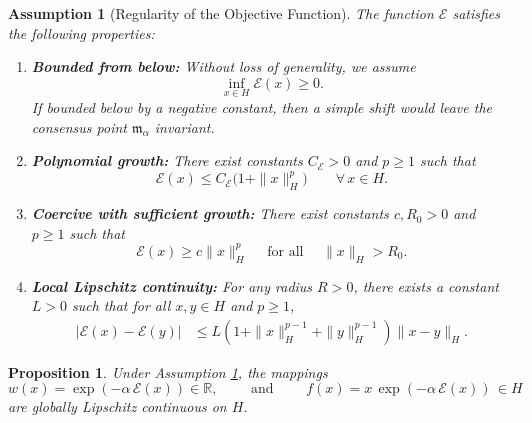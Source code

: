 \documentclass[10pt,a4paper]{amsart}
\newtheorem{assumption}{Assumption}
\newtheorem{proposition}{Proposition}
\begin{document}
\begin{assumption}[Regularity of the Objective Function]
\label{assum:objective}
The function $\mathscr{E}$ satisfies the following properties:
\begin{enumerate}
    \item \textbf{Bounded from below:} Without loss of generality, we assume 
    \begin{equation*}
        \inf_{x \in H} \mathscr{E}(x) \geq 0 .
    \end{equation*}
    If bounded below by a negative constant, then a simple shift would leave the consensus point $\mathfrak{m}_\alpha$ invariant. 
    \item \textbf{Polynomial growth:} There exist constants $C_{\mathscr{E}} > 0$ and $p \geq 1$ such that 
    \begin{equation*}
        \mathscr{E}(x) \leq C_{\mathscr{E}} \big(1 + \|x\|_H^p\big) \qquad \forall\, x\in H.
    \end{equation*}
    \item  \textbf{Coercive with sufficient growth:} There exist constants $c, R_0 > 0$ and $p \geq 1$ such that 
       \begin{equation*}
       \mathscr{E}(x) \geq c\|x\|_H^p \quad \mbox{ for all }\quad \|x\|_H > R_0.
    \end{equation*}
    \item \textbf{Local Lipschitz continuity:} For any radius $R > 0$, there exists a constant $L > 0$ such that for all $x, y \in H$ and $p\geq 1$,
    \begin{equation*}
    \begin{aligned}
        |\mathscr{E}(x) - \mathscr{E}(y)|
        & \leq L(1+\|x\|_H^{p-1}+\|y\|_H^{p-1})\|x - y\|_H.
    \end{aligned}
    \end{equation*}
\end{enumerate}
\end{assumption}

\begin{proposition}
\label{prop:global_lipschitz}
Under Assumption \ref{assum:objective}, the mappings 
\begin{equation*}
    w(x) = \exp(-\alpha\, \mathscr{E}(x)) \in \mathbb{R}, \qquad \text{ and } \qquad f(x) = x\,\exp(-\alpha\, \mathscr{E}(x)) \,\in H
\end{equation*}
are globally Lipschitz continuous on $H$.
\end{proposition}
\end{document}
